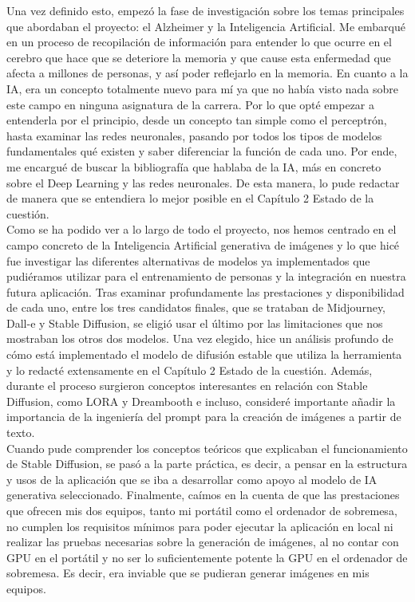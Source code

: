 Una vez definido esto, empezó la fase de investigación sobre los temas principales que abordaban el proyecto: el Alzheimer y la Inteligencia Artificial. Me embarqué en un proceso de recopilación de información para entender lo que ocurre en el cerebro que hace que se deteriore la memoria y que cause esta enfermedad que afecta a millones de personas, y así poder reflejarlo en la memoria. En cuanto a la IA, era un concepto totalmente nuevo para mí ya que no había visto nada sobre este campo en ninguna asignatura de la carrera. Por lo que opté empezar a entenderla por el principio, desde un concepto tan simple como el perceptrón, hasta examinar las redes neuronales, pasando por todos los tipos de modelos fundamentales qué existen y saber diferenciar la función de cada uno. Por ende, me encargué de buscar la bibliografía que hablaba de la IA, más en concreto sobre el Deep Learning y las redes neuronales. De esta manera, lo pude redactar de manera que se entendiera lo mejor posible en el Capítulo 2 Estado de la cuestión. \\

Como se ha podido ver a lo largo de todo el proyecto, nos hemos centrado en el campo concreto de la Inteligencia Artificial generativa de imágenes y lo que hicé fue investigar las diferentes alternativas de modelos ya implementados que pudiéramos utilizar para el entrenamiento de personas y la integración en nuestra futura aplicación. Tras examinar profundamente las prestaciones y disponibilidad de cada uno, entre los tres candidatos finales, que se trataban de Midjourney, Dall-e y Stable Diffusion, se eligió usar el último por las limitaciones que nos mostraban los otros dos modelos. Una vez elegido, hice un análisis profundo de cómo está implementado el modelo de difusión estable que utiliza la herramienta y lo redacté extensamente en el Capítulo 2 Estado de la cuestión. Además, durante el proceso surgieron conceptos interesantes en relación con Stable Diffusion, como LORA y Dreambooth e incluso, consideré importante añadir la importancia de la ingeniería del prompt para la creación de imágenes a partir de texto. \\

Cuando pude comprender los conceptos teóricos que explicaban el funcionamiento de Stable Diffusion, se pasó a la parte práctica, es decir, a pensar en la estructura y usos de la aplicación que se iba a desarrollar como apoyo al modelo de IA generativa seleccionado. Finalmente, caímos en la cuenta de que las prestaciones que ofrecen mis dos equipos, tanto mi portátil como el ordenador de sobremesa, no cumplen los requisitos mínimos para poder ejecutar la aplicación en local ni realizar las pruebas necesarias sobre la generación de imágenes, al no contar con GPU en el portátil y no ser lo suficientemente potente la GPU en el ordenador de sobremesa. Es decir, era inviable que se pudieran generar imágenes en mis equipos.\\

